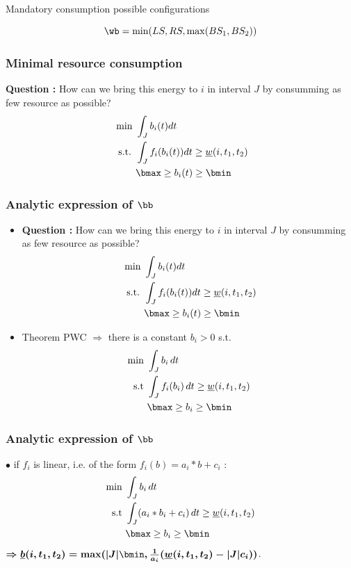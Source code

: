 \begin{frame}{Mandatory consumption possible configurations}
  
  \[\wb = \min ( LS, RS, \max (BS_1,BS_2))\]
\end{frame}

\begin{frame}
  \frametitle{Minimal resource consumption}
  \begin{center}
    
  \end{center}
  \vfill
  \textbf{Question : }
  How can we bring this energy to $i$ in interval $J$ by consumming as few resource as possible?
  \vfill
  \begin{align*}
    \text{ min }& \int_{J} b_i(t)dt  \\
    \text{ s.t. } & \int_{J}f_i(b_i(t))dt \ge  \underline{w}(i,t_1,t_2) \\
                &  \bmax \ge b_i(t) \ge \bmin
  \end{align*}
  \vfill
\end{frame}

\begin{frame}
  \frametitle{Analytic expression of $\bb$}
  \vfill
  \begin{itemize}
  \item  \textbf{Question : }
    How can we bring this energy to $i$ in interval $J$ by consumming as few resource as possible?
    \vfill
    \begin{align*}
      \text{ min }& \int_{J} b_i(t)dt  \\
      \text{ s.t. } & \int_{J}f_i(b_i(t))dt \ge  \underline{w}(i,t_1,t_2) \\
                  &  \bmax \ge b_i(t) \ge \bmin
    \end{align*}
    \vfill
  \item Theorem PWC $\Rightarrow$ there is a constant $b_{i} > 0 $
    s.t. 
    \begin{align*}
      \text{min }  & \int_{J} b_i\,dt  \\
      \text{s.t } & \int_{J}f_i(b_i)\,dt \ge
                    \underline{w}(i,t_1,t_2)\\
                   & \bmax \ge b_i \ge \bmin
    \end{align*}
  \end{itemize}
  \vfill
\end{frame}

\begin{frame}
  \frametitle{Analytic expression of $\bb$}
  \vfill
  $\bullet$ if $f_i$ is linear, i.e. of the form $f_i(b)= a_i*b+c_i$ :
    \begin{align*}
      \text{min }  & \int_{J} b_i\,dt  \\
      \text{s.t } & \int_{J}(a_i*b_i+c_i)\,dt \ge
                    \underline{w}(i,t_1,t_2)\\
                   & \bmax \ge b_i \ge \bmin
    \end{align*}
  { \color{blue!80!black!80}
    $\boldmath{\Rightarrow  \underline{b}(i,t_1,t_2)= \max ( |J|\bmin, \frac{1}{a_i}( \underline{w}(i,t_1,t_2)-|J|c_i))}$}.
 
\end{frame}

